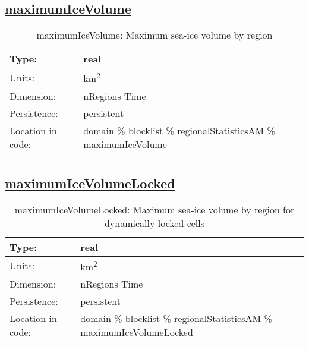 \subsection[maximumIceVolume]{\hyperref[sec:var_tab_regionalStatisticsAM]{maximumIceVolume}}
\label{subsec:var_sec_regionalStatisticsAM_maximumIceVolume}
\begin{center}
\begin{longtable}{| p{2.0in} | p{4.0in} |}
        \hline 
        Type: & real \\
        \hline 
        Units: & \si{km^2} \\
        \hline 
        Dimension: & nRegions Time \\
        \hline 
        Persistence: & persistent \\
        \hline 
         Location in code: & domain \% blocklist \% regionalStatisticsAM \% maximumIceVolume \\
         \hline 
    \caption{maximumIceVolume: Maximum sea-ice volume by region}
\end{longtable}
\end{center}
\subsection[maximumIceVolumeLocked]{\hyperref[sec:var_tab_regionalStatisticsAM]{maximumIceVolumeLocked}}
\label{subsec:var_sec_regionalStatisticsAM_maximumIceVolumeLocked}
\begin{center}
\begin{longtable}{| p{2.0in} | p{4.0in} |}
        \hline 
        Type: & real \\
        \hline 
        Units: & \si{km^2} \\
        \hline 
        Dimension: & nRegions Time \\
        \hline 
        Persistence: & persistent \\
        \hline 
         Location in code: & domain \% blocklist \% regionalStatisticsAM \% maximumIceVolumeLocked \\
         \hline 
    \caption{maximumIceVolumeLocked: Maximum sea-ice volume by region for dynamically locked cells}
\end{longtable}
\end{center}
